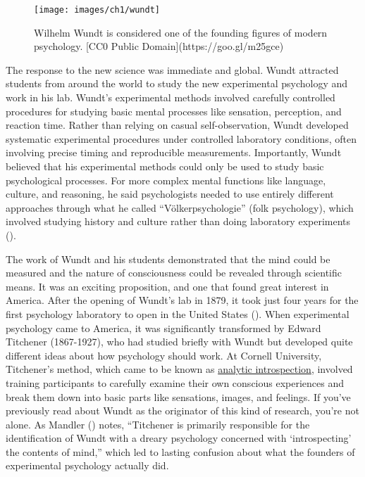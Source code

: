 \documentclass[
]{krantz}
\begin{document}
\begin{figure}

{\centering \texttt{[image: images/ch1/wundt]} 

}

\caption{Wilhelm Wundt is considered one of the founding figures of modern psychology. [CC0 Public Domain](https://goo.gl/m25gce)}\label{fig:wundt}
\end{figure}

The response to the new science was immediate and global. Wundt attracted students from around the world to study the new experimental psychology and work in his lab. Wundt's experimental methods involved carefully controlled procedures for studying basic mental processes like sensation, perception, and reaction time. Rather than relying on casual self-observation, Wundt developed systematic experimental procedures under controlled laboratory conditions, often involving precise timing and reproducible measurements. Importantly, Wundt believed that his experimental methods could only be used to study basic psychological processes. For more complex mental functions like language, culture, and reasoning, he said psychologists needed to use entirely different approaches through what he called ``Völkerpsychologie'' (folk psychology), which involved studying history and culture rather than doing laboratory experiments ().

The work of Wundt and his students demonstrated that the mind could be measured and the nature of consciousness could be revealed through scientific means. It was an exciting proposition, and one that found great interest in America. After the opening of Wundt's lab in 1879, it took just four years for the first psychology laboratory to open in the United States (). When experimental psychology came to America, it was significantly transformed by Edward Titchener (1867-1927), who had studied briefly with Wundt but developed quite different ideas about how psychology should work. At Cornell University, Titchener's method, which came to be known as \hyperref[analytic-introspection]{analytic introspection}, involved training participants to carefully examine their own conscious experiences and break them down into basic parts like sensations, images, and feelings. If you've previously read about Wundt as the originator of this kind of research, you're not alone. As Mandler () notes, ``Titchener is primarily responsible for the identification of Wundt with a dreary psychology concerned with `introspecting' the contents of mind,'' which led to lasting confusion about what the founders of experimental psychology actually did.
\end{document}
